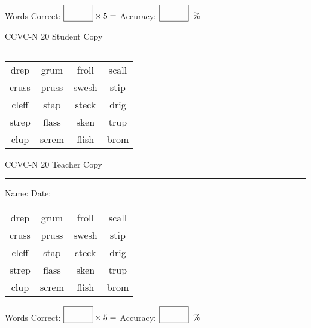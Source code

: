 \documentclass{memoir}
\begin{document}
\small

Words Correct: $\fbox{\phantom{\huge 100}} \times 5 = $ Accuracy: $\fbox{\phantom{\huge 100}}\;\; \%$ 

\vfill

\newpage



\footnotesize \noindent
CCVC-N 20 \hfill Student Copy
\smallskip
\hrule

\Large

\setlength{\tabcolsep}{14pt}
\def\arraystretch{3}

{\selectfont


\begin{vplace}[0.5]
\begin{center}
\begin{tabular}{cccc}
drep & grum       & froll & scall \\
cruss & pruss       & swesh & stip \\
cleff            & stap & steck & drig        \\
strep & flass & sken & trup       \\
clup & screm & flish             & brom          \\
\end{tabular}
\end{center}
\end{vplace}

}

\newpage

\footnotesize \noindent
CCVC-N 20 \hfill Teacher Copy
\smallskip
\hrule

\small

\vfill

\noindent
Name: \underline{\hspace{1.75in}} \hfill Date: \underline{\hspace{1in}}

\Large

{\selectfont


\begin{vplace}[0.5]
\begin{center}
\begin{tabular}{cccc}
drep & grum       & froll & scall \\
cruss & pruss       & swesh & stip \\
cleff            & stap & steck & drig        \\
strep & flass & sken & trup       \\
clup & screm & flish             & brom          \\
\end{tabular}
\end{center}
\end{vplace}



}

\small

Words Correct: $\fbox{\phantom{\huge 100}} \times 5 = $ Accuracy: $\fbox{\phantom{\huge 100}}\;\; \%$ 

\vfill

\end{document}

